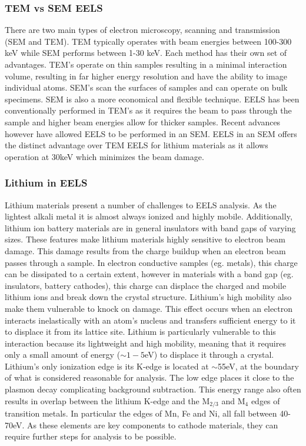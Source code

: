 \subsubsection{TEM vs SEM EELS}
There are two main types of electron microscopy, scanning and transmission (SEM and TEM).  TEM typically operates with beam energies between 100-300 keV while SEM performs between 1-30 keV.  Each method has their own set of advantages.  TEM's operate on thin samples resulting in a minimal interaction volume, resulting in far higher energy resolution and have the ability to image individual atoms. SEM's scan the surfaces of samples and can operate on bulk specimens.  SEM is also a more economical and flexible technique.   EELS has been conventionally performed in TEM's as it requires the beam to pass through the sample and higher beam energies allow for thicker samples. Recent advances however have allowed EELS to be performed in an SEM.   EELS in an SEM offers the distinct advantage over TEM EELS for lithium materials as it allows operation at 30keV which minimizes the beam damage.

\subsubsection{Lithium in EELS}
Lithium materials present a number of challenges to EELS analysis.  As the lightest alkali metal it is almost always ionized and highly mobile. Additionally, lithium ion battery materials are in general insulators with band gaps of varying sizes. These features make lithium materials highly sensitive to electron beam damage.  This damage results from the charge buildup when an electron beam passes through a sample.  In electron conductive samples (eg. metals), this charge can be dissipated to a certain extent, however in materials with a band gap (eg. insulators, battery cathodes), this charge can displace the charged and mobile lithium ions and break down the crystal structure.  Lithium's high mobility also make them vulnerable to knock on damage.  This effect occurs when an electron interacts inelastically with an atom's nucleus and transfers sufficient energy to it to displace it from its lattice site.  Lithium is particularly vulnerable to this interaction because its lightweight and high mobility, meaning that it requires only a small amount of energy ($ \sim 1-5$eV) to displace it through a crystal.\\  
Lithium's only ionization edge is its K-edge is located at $\mathrm{\sim}$55eV, at the boundary of what is considered reasonable for analysis.  The low edge places it close to the plasmon decay complicating background subtraction.  This energy range also often results in overlap between the lithium K-edge and the $\mathrm{M_{2 / 3}}$ and $\mathrm{M_4}$ edges of transition metals. In particular the edges of Mn, Fe and Ni, all fall between 40-70eV.  As these elements are key components to cathode materials, they can require further steps for analysis to be possible.



